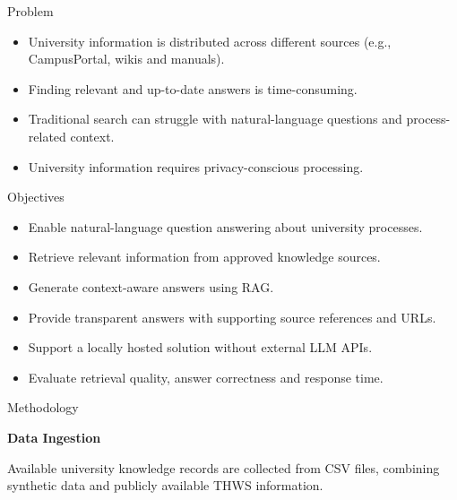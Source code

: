 \documentclass[final]{article}
\newcommand{\methoditem}[1]{%
  \textcolor{KIWiOrange}{\large\textbullet}\hspace{2mm}%
  \textbf{\color{KIWiDark}#1}\\[-1mm]
  \ignorespaces
}
\begin{document}
\begin{minipage}[t][\dimexpr\textheight-10pt\relax][s]{\textwidth}
\vspace{2mm}
\begin{minipage}[t]{0.485\textwidth}\vspace{0pt}
\begin{sectionbox}{Problem}
\begin{itemize}
  \item University information is distributed across different sources
  (e.g., CampusPortal, wikis and manuals).
  \item Finding relevant and up-to-date answers is time-consuming.
  \item Traditional search can struggle with natural-language questions
  and process-related context.
  \item University information requires privacy-conscious processing.
\end{itemize}
\end{sectionbox}
\end{minipage}
\hfill
\begin{minipage}[t]{0.485\textwidth}\vspace{0pt}
\begin{sectionbox}{Objectives}
\begin{itemize}
  \item Enable natural-language question answering about university processes.
  \item Retrieve relevant information from approved knowledge sources.
  \item Generate context-aware answers using RAG.
  \item Provide transparent answers with supporting source references and URLs.
  \item Support a locally hosted solution without external LLM APIs.
  \item Evaluate retrieval quality, answer correctness and response time.
\end{itemize}
\end{sectionbox}
\end{minipage}

\vfill
\begin{sectionbox}{Methodology}
\begin{minipage}[t]{0.485\textwidth}\vspace{0pt}
  \methoditem{Data Ingestion}
  Available university knowledge records are collected from CSV files,
  combining synthetic data and publicly available THWS information.


\end{minipage}
\end{sectionbox}
\end{minipage}
\end{document}
